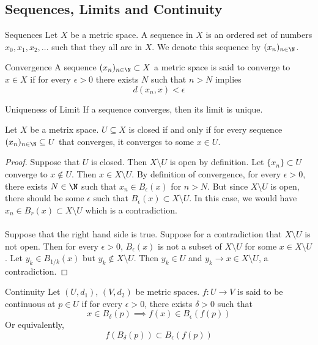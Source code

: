 \documentclass[a4paper]{article}
\begin{document}
\subsection{Sequences, Limits and Continuity}
\begin{defn}{Sequences}{} Let $X$ be a metric space. A sequence in $X$ is an ordered set of numbers $x_0,x_1,x_2,\dots$ such that they all are in $X$. We denote this sequence by $(x_n)_{n\in\N}$. 
\end{defn}

\begin{defn}{Convergence}{} A sequence $(x_n)_{n\in\N}\subset X$ a metric space is said to converge to $x\in X$ if for every $\epsilon>0$ there exists $N$ such that $n>N$ implies $$d(x_n,x)<\epsilon$$
\end{defn}

\begin{prp}{Uniqueness of Limit}{} If a sequence converges, then its limit is unique. 
\end{prp}

\begin{prp}{}{} Let $X$ be a metrix space. $U\subseteq X$ is closed if and only if for every sequence $(x_n)_{n\in\N}\subseteq U$ that converges, it converges to some $x\in U$. \tcbline
\begin{proof} Suppose that $U$ is closed. Then $X\setminus U$ is open by definition. Let $\{x_n\}\subset U$ converge to $x\notin U$. Then $x\in X\setminus U$. By definition of convergence, for every $\epsilon>0$, there exists $N\in\N$ such that $x_n\in B_\epsilon(x)$ for $n>N$. But since $X\setminus U$ is open, there should be some $\epsilon$ such that $B_\epsilon(x)\subset X\setminus U$. In this case, we would have $x_n\in B_r(x)\subset X\setminus U$ which is a contradiction. \\~\\
Suppose that the right hand side is true. Suppose for a contradiction that $X\setminus U$ is not open. Then for every $\epsilon>0$, $B_\epsilon(x)$ is not a subset of $X\setminus U$ for some $x\in X\setminus U$. Let $y_k\in B_{1/k}(x)$ but $y_k\notin X\setminus U$. Then $y_k\in U$ and $y_k\to x\in X\setminus U$, a contradiction. 
\end{proof}
\end{prp}

\begin{defn}{Continuity}{} Let $(U,d_1)$, $(V,d_2)$ be metric spaces. $f:U\to V$ is said to be continuous at $p\in U$ if for every $\epsilon>0$, there exists $\delta>0$ such that $$x\in B_{\delta}(p)\implies f(x)\in B_{\epsilon}(f(p))$$ Or equivalently, $$f(B_{\delta}(p))\subset B_{\epsilon}(f(p))$$
\end{defn}
\end{document}

